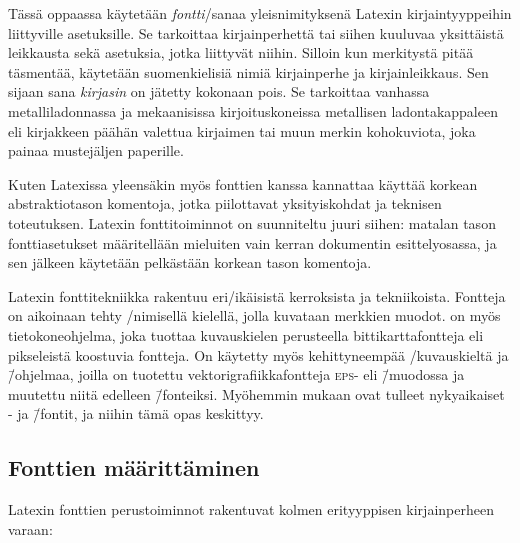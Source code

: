 Tässä oppaassa käytetään \emph{fontti}\-/sanaa yleisnimityksenä Latexin
kirjaintyyppeihin liittyville asetuksille. Se tarkoittaa kirjainperhettä
tai siihen kuuluvaa yksittäistä leikkausta sekä asetuksia, jotka
liittyvät niihin. Silloin kun merkitystä pitää täsmentää, käytetään
suomenkielisiä nimiä kirjainperhe ja kirjainleikkaus. Sen sijaan sana
\emph{kirjasin} on jätetty kokonaan pois. Se tarkoittaa vanhassa
metalliladonnassa ja mekaanisissa kirjoituskoneissa metallisen
ladontakappaleen eli kirjakkeen päähän valettua kirjaimen tai muun
merkin kohokuviota, joka painaa mustejäljen paperille.

Kuten Latexissa yleensäkin myös fonttien kanssa kannattaa käyttää
korkean abstraktiotason komentoja, jotka piilottavat yksityiskohdat ja
teknisen toteutuksen. Latexin fonttitoiminnot on suunniteltu juuri
siihen: matalan tason font\-ti\-ase\-tuk\-set määritellään mieluiten
vain kerran dokumentin esittelyosassa, ja sen jälkeen käytetään
pelkästään korkean tason komentoja.

Latexin fonttitekniikka rakentuu eri\-/ikäisistä kerroksista ja
tekniikoista. Fontteja on aikoinaan tehty
\-/nimisellä kielellä, jolla
kuvataan merkkien muodot.  on myös tietokoneohjelma,
joka tuottaa kuvauskielen perusteella bittikarttafontteja eli
pikseleistä koostuvia fontteja. On käytetty myös kehittyneempää
\-/kuvauskieltä ja \=/ohjelmaa,
joilla on tuotettu vek\-tori\-gra\-fiik\-ka\-font\-te\-ja \textsc{eps}-
eli  \=/muodossa ja muutettu niitä
edelleen  \=/fonteiksi. Myöhemmin mukaan
ovat tulleet nyky\-aikai\-set - ja  \=/fontit, ja niihin tämä opas keskittyy.

\subsection{Fonttien määrittäminen}
\label{luku:fontin_valinta}

Latexin fonttien perus\-toiminnot rakentuvat kolmen erityyppisen
kirjainperheen varaan:


